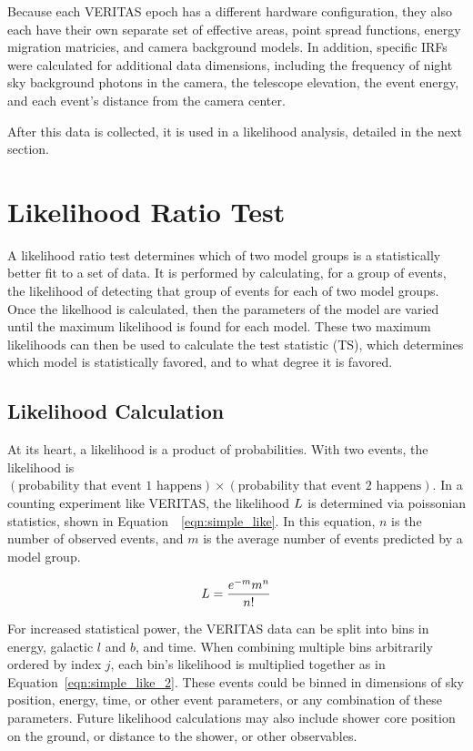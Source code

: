   Because each VERITAS epoch has a different hardware configuration, they also each have their own separate set of effective areas, point spread functions, energy migration matricies, and camera background models.
  In addition, specific IRFs were calculated for additional data dimensions, including the frequency of night sky background photons in the camera, the telescope elevation, the event energy, and each event's distance from the camera center.
  
  After this data is collected, it is used in a likelihood analysis, detailed in the next section.

\section{Likelihood Ratio Test}\label{sec:likeratio}
  A likelihood ratio test determines which of two model groups is a statistically better fit to a set of data.
  It is performed by calculating, for a group of events, the likelihood of detecting that group of events for each of two model groups.
  Once the likelhood is calculated, then the parameters of the model are varied until the maximum likelihood is found for each model.
  These two maximum likelihoods can then be used to calculate the test statistic (TS), which determines which model is statistically favored, and to what degree it is favored.
  
  \subsection{Likelihood Calculation}
  At its heart, a likelihood is a product of probabilities.
  With two events, the likelihood is $(\textrm{probability that event 1 happens})\times(\textrm{probability that event 2 happens})$.
  In a counting experiment like VERITAS, the likelihood $L$ is determined via poissonian statistics, shown in Equation~~\ref{eqn:simple_like}.
  In this equation, $n$ is the number of observed events, and $m$ is the average number of events predicted by a model group.
  
  \begin{equation}\label{eqn:simple_like}
    L = \frac{e^{-m} m^n}{n!}
  \end{equation}
  
  For increased statistical power, the VERITAS data can be split into bins in energy, galactic $l$ and $b$, and time.
  When combining multiple bins arbitrarily ordered by index $j$, each bin's likelihood is multiplied together as in Equation~\ref{eqn:simple_like_2}.
  These events could be binned in dimensions of sky position, energy, time, or other event parameters, or any combination of these parameters.
  Future likelihood calculations may also include shower core position on the ground, or distance to the shower, or other observables.
  
